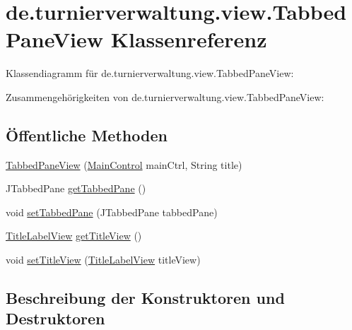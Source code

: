 \hypertarget{classde_1_1turnierverwaltung_1_1view_1_1_tabbed_pane_view}{}\section{de.\+turnierverwaltung.\+view.\+Tabbed\+Pane\+View Klassenreferenz}
\label{classde_1_1turnierverwaltung_1_1view_1_1_tabbed_pane_view}


Klassendiagramm für de.\+turnierverwaltung.\+view.\+Tabbed\+Pane\+View\+:


Zusammengehörigkeiten von de.\+turnierverwaltung.\+view.\+Tabbed\+Pane\+View\+:
\subsection*{Öffentliche Methoden}
\begin{DoxyCompactItemize}
\item 
\hyperlink{classde_1_1turnierverwaltung_1_1view_1_1_tabbed_pane_view_a06a99bb851bc5ebb4a0cb1a6a182b5b2}{Tabbed\+Pane\+View} (\hyperlink{classde_1_1turnierverwaltung_1_1control_1_1_main_control}{Main\+Control} main\+Ctrl, String title)
\item 
J\+Tabbed\+Pane \hyperlink{classde_1_1turnierverwaltung_1_1view_1_1_tabbed_pane_view_aa0c523351e76a3ae28f2a3ebe29d8854}{get\+Tabbed\+Pane} ()
\item 
void \hyperlink{classde_1_1turnierverwaltung_1_1view_1_1_tabbed_pane_view_ab209ad9fbd453fe42bf14bea79e64e8b}{set\+Tabbed\+Pane} (J\+Tabbed\+Pane tabbed\+Pane)
\item 
\hyperlink{classde_1_1turnierverwaltung_1_1view_1_1_title_label_view}{Title\+Label\+View} \hyperlink{classde_1_1turnierverwaltung_1_1view_1_1_tabbed_pane_view_af45e5765e41200209be7eac554624bbd}{get\+Title\+View} ()
\item 
void \hyperlink{classde_1_1turnierverwaltung_1_1view_1_1_tabbed_pane_view_a26919e9ea544e88c599089f063546c90}{set\+Title\+View} (\hyperlink{classde_1_1turnierverwaltung_1_1view_1_1_title_label_view}{Title\+Label\+View} title\+View)
\end{DoxyCompactItemize}


\subsection{Beschreibung der Konstruktoren und Destruktoren}
